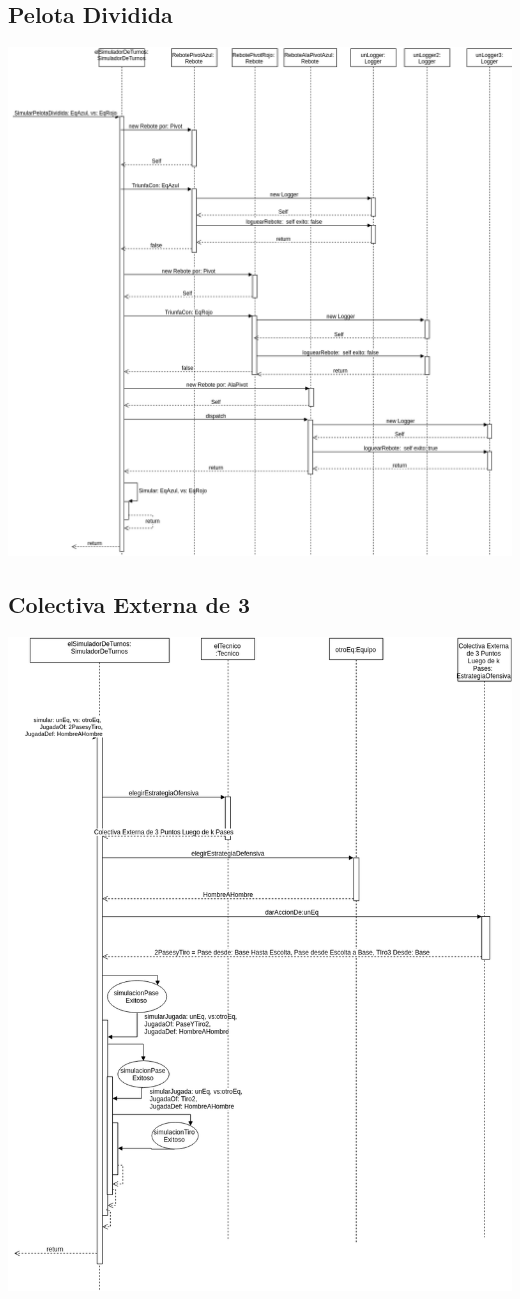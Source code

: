 \subsection{Pelota Dividida}
\includegraphics[width=\textwidth]{imgs/PelotaDivididaSecuencia.png}

\subsection{Colectiva Externa de 3}
\includegraphics[width=\textwidth]{imgs/colectivaExternaDe3Secuencia.png}

